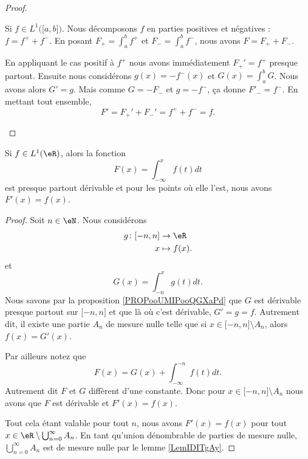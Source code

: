 \begin{proof}
\begin{subproof}
		Si \( f\in L^1\big( \mathopen[ a,b\mathclose] \big)\). Nous décomposons \( f\) en parties positives et négatives : \( f=f^++f^-\). En posant \( F_+=\int_a^b f^+\) et \( F_-=\int_a^bf^-\), nous avons \( F=F_++F_-\).

		En appliquant le cas positif à \( f^+\) nous avons immédiatement \( F_+'=f^+\) presque partout. Ensuite nous considérons \( g(x)=-f^-(x)\) et \( G(x)=\int_a^bG\). Nous avons alors \( G'=g\). Mais comme \( G=-F_-\) et \( g=-f^-\), ça donne \( F'_-=f^-\). En mettant tout ensemble,
		\begin{equation}
			F'=F_+'+F_-'=f^++f^-=f.
		\end{equation}
	\end{subproof}
\end{proof}

\begin{proposition} \label{PropJLnPpaw}
	Si \( f\in L^1(\eR)\), alors la fonction
	\begin{equation}
		F(x)=\int_{-\infty}^xf(t)dt
	\end{equation}
	est presque partout dérivable et pour les points où elle l'est, nous avons \( F'(x)=f(x)\).
\end{proposition}

\begin{proof}
	Soit \( n\in \eN\). Nous considérons
	\begin{equation}
		\begin{aligned}
			g\colon \mathopen[ -n,n\mathclose] & \to \eR       \\
			x                                  & \mapsto f(x).
		\end{aligned}
	\end{equation}
	et
	\begin{equation}
		G(x)=\int_{-n}^xg(t)dt.
	\end{equation}
	Nous savons par la proposition \ref{PROPooUMIPooQGXaPd} que \( G\) est dérivable presque partout sur \( \mathopen[ -n,n\mathclose]\) et que là où c'est dérivable, \( G'=g=f\). Autrement dit, il existe une partie \( A_n\) de mesure nulle telle que si \( x\in \mathopen[ -n,n\mathclose]\setminus A_n\), alors \( f(x)=G'(x)\).

	Par ailleurs notez que
	\begin{equation}
		F(x)=G(x)+\int_{-\infty}^{-n}f(t)dt.
	\end{equation}
	Autrement dit \( F\) et \( G\) diffèrent d'une constante. Donc pour \( x\in\mathopen[ -n,n\mathclose]\setminus A_n\) nous avons que \( F\) est dérivable et \( F'(x)=f(x)\).

	Tout cela étant valable pour tout \( n\), nous avons \( F'(x)=f(x)\) pour tout \( x\in \eR\setminus\bigcup_{n=0}^{\infty}A_n\). En tant qu'union dénombrable de parties de mesure nulle, \( \bigcup_{n=0}^{\infty}A_n\) est de mesure nulle par le lemme \ref{LemIDITgAy}.
\end{proof}



